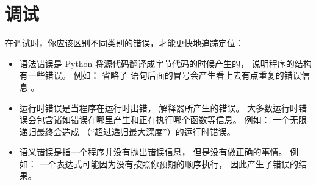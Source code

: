 

\chapter{调试}



在调试时，你应该区别不同类别的错误，才能更快地追踪定位：

\begin{itemize}


\item 语法错误是 Python 将源代码翻译成字节代码的时候产生的， 说明程序的结构有一些错误。  
例如： 省略了  语句后面的冒号会产生看上去有点重复的错误信息  。


\item 运行时错误是当程序在运行时出错， 解释器所产生的错误。  
大多数运行时错误会包含诸如错误在哪里产生和正在执行哪个函数等信息。  
例如： 一个无限递归最终会造成  （``超过递归最大深度''）的运行时错误。


\item 语义错误是指一个程序并没有抛出错误信息， 但是没有做正确的事情。  
例如： 一个表达式可能因为没有按照你预期的顺序执行， 因此产生了错误的结果。

\end{itemize}

